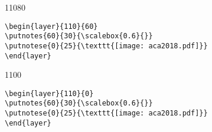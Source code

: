 \documentclass[dvipdfmx]{article}
\begin{document}
\begin{layer}{110}{80}
\end{layer}

\begin{verbatim}
\begin{layer}{110}{60}
\putnotes{60}{30}{\scalebox{0.6}{}}
\putnotese{0}{25}{\texttt{[image: aca2018.pdf]}} 
\end{layer}

\end{verbatim}

\newpage

\begin{layer}{110}{0}
\end{layer}

\begin{verbatim}
\begin{layer}{110}{0}
\putnotes{60}{30}{\scalebox{0.6}{}}
\putnotese{0}{25}{\texttt{[image: aca2018.pdf]}} 
\end{layer}

\end{verbatim}
\end{document}
